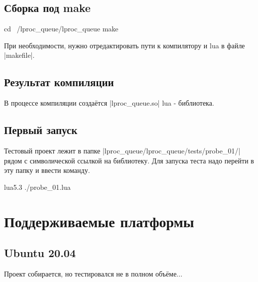\documentclass[a4paper,12pt,russian, oneside]{article}
\renewcommand{\verb}{\collectverb{\color{Violet}}}
\begin{document}
\subsection{Сборка под make}


\begin{BASHcode}
cd ~/lproc_queue/lproc_queue
make
\end{BASHcode}

При необходимости, нужно отредактировать пути к компилятору и lua в файле \verb|makefile|.



\subsection{Результат компиляции}

В процессе компиляции создаётся \verb|lproc_queue.so| lua - библиотека.

\subsection{Первый запуск}

Тестовый проект лежит в папке \verb|lproc_queue/lproc_queue/tests/probe_01/|
рядом с символической ссылкой на библиотеку. Для запуска теста надо перейти
в эту папку и ввести команду.
\begin{BASHcode}
lua5.3 ./probe_01.lua
\end{BASHcode}



\newpage
\section{Поддерживаемые платформы}

\subsection{Ubuntu 20.04}

Проект собирается, но тестировался не в полном объёме...







\newpage
\end{document}

